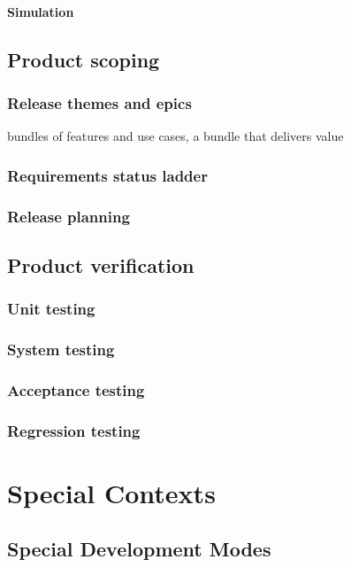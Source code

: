 \documentclass{reqengbook}
\begin{document}
\subsection{Simulation}


\chapter{Product scoping}

\section{Release themes and epics}

bundles of features and use cases, a bundle that delivers value

\section{Requirements status ladder}

\section{Release planning} 

\chapter{Product verification}
\section{Unit testing}
\section{System testing}
\section{Acceptance testing}
\section{Regression testing}

\part{Special Contexts}

\chapter{Special Development Modes}
\end{document}
